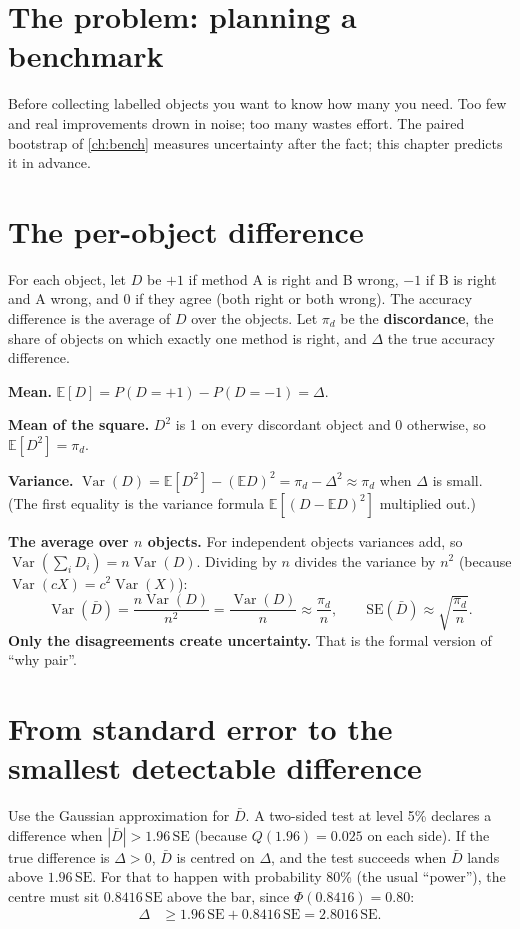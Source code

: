 \documentclass[11pt,a4paper,oneside,openany]{book}
\newcommand{\E}{\mathbb{E}}
\newcommand{\Var}{\operatorname{Var}}
\begin{document}
\section{The problem: planning a benchmark}

Before collecting labelled objects you want to know how many you need. Too few and real improvements drown in noise; too many wastes effort. The paired bootstrap of
\cref{ch:bench} measures uncertainty after the fact; this chapter predicts it in advance.

\section{The per-object difference}

For each object, let $D$ be $+1$ if method A is right and B wrong, $-1$ if B is right and A wrong, and 0 if they agree (both right or both wrong). The accuracy difference is the
average of $D$ over the objects. Let $\pi_d$ be the \textbf{discordance}, the share of objects on which exactly one method is right, and $\Delta$ the true accuracy difference.

\textbf{Mean.} $\E[D]=P(D=+1)-P(D=-1)=\Delta$.

\textbf{Mean of the square.} $D^2$ is 1 on every discordant object and 0 otherwise, so $\E[D^2]=\pi_d$.

\textbf{Variance.} $\Var(D)=\E[D^2]-(\E D)^2=\pi_d-\Delta^2\approx\pi_d$ when $\Delta$ is small. (The first equality is the variance formula $\E[(D-\E D)^2]$ multiplied out.)

\textbf{The average over $n$ objects.} For independent objects variances add, so $\Var(\sum_iD_i)=n\Var(D)$. Dividing by $n$ divides the variance by $n^2$ (because
$\Var(cX)=c^2\Var(X)$):
\[
  \Var(\bar D)=\frac{n\Var(D)}{n^2}=\frac{\Var(D)}{n}\approx\frac{\pi_d}{n},\qquad \mathrm{SE}(\bar D)\approx\sqrt{\frac{\pi_d}{n}} .
\]
\textbf{Only the disagreements create uncertainty.} That is the formal version of ``why pair''.

\section{From standard error to the smallest detectable difference}

Use the Gaussian approximation for $\bar D$. A two-sided test at level 5\% declares a difference when $|\bar D|>1.96\,\mathrm{SE}$ (because $Q(1.96)=0.025$ on each side). If the
true difference is $\Delta>0$, $\bar D$ is centred on $\Delta$, and the test succeeds when $\bar D$ lands above $1.96\,\mathrm{SE}$. For that to happen with probability 80\% (the
usual ``power''), the centre must sit $0.8416\,\mathrm{SE}$ above the bar, since $\Phi(0.8416)=0.80$:
\begin{align*}
\Delta &\ge 1.96\,\mathrm{SE}+0.8416\,\mathrm{SE}=2.8016\,\mathrm{SE} .
\end{align*}
\end{document}
